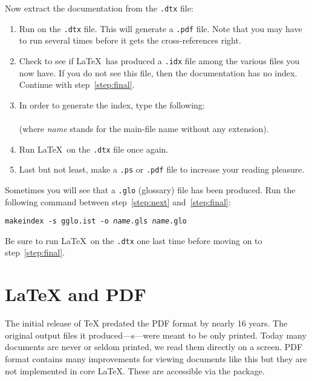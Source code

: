 \noindent Now extract the documentation from the
\texttt{.dtx} file:

\begin{enumerate}
  \item Run  on the \texttt{.dtx} file.  This will generate a
        \texttt{.pdf} file. Note that you may have to run 
        several times before it gets the cross-references right.
  \item Check to see if \LaTeX\ has produced a \texttt{.idx} file
        among the various files you now have.
        If you do not see this file, then the documentation has no index. Continue
        with step~\ref{step:final}.
  \item In order to generate the index, type the following:\\
        \\
        (where \textit{name} stands for the main-file name without any
        extension).
  \item Run \LaTeX\ on the \texttt{.dtx} file once again.\label{step:next}

  \item Last but not least, make a \texttt{.ps} or \texttt{.pdf}
        file to increase your reading pleasure.\label{step:final}

\end{enumerate}

Sometimes you will see that a \texttt{.glo}
(glossary) file has been produced. Run the following
command between
step~\ref{step:next} and~\ref{step:final}:

\noindent\texttt{makeindex -s gglo.ist -o \textit{name}.gls \textit{name}.glo}

\noindent Be sure to run \LaTeX\ on the \texttt{.dtx} one last
time before moving on to step~\ref{step:final}.


\section{\LaTeX{} and PDF}\label{sec:pdftex}
\begingroup
{}

The initial release of \TeX{} predated the PDF format by nearly 16 years. The
original output files it produced---s---were meant to be only
printed. Today many documents are never or seldom printed, we read them
directly on a screen. PDF format contains many improvements for viewing
documents like this but they are not implemented in core \LaTeX{}. These are
accessible via the  package.

